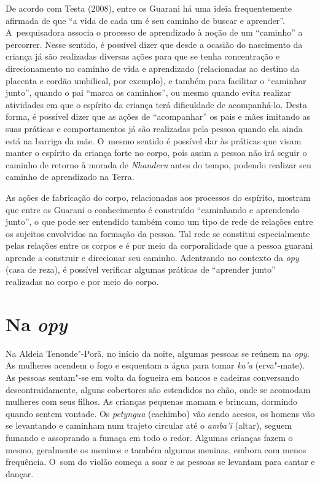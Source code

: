 De acordo com Testa (2008), entre os Guarani há uma ideia frequentemente
afirmada de que ``a vida de cada um é seu caminho de buscar e aprender''.
A~pesquisadora associa o processo de aprendizado à noção de um ``caminho''
a percorrer. Nesse sentido, é possível dizer que desde a ocasião do
nascimento da criança já são realizadas diversas ações para que se
tenha concentração e direcionamento no caminho de vida e aprendizado
(relacionadas ao destino da placenta e cordão umbilical, por exemplo),
e também para facilitar o ``caminhar junto'', quando o pai ``marca os
caminhos'', ou mesmo quando evita realizar atividades em que o espírito
da criança terá dificuldade de acompanhá-lo. Desta forma, é possível
dizer que as ações de ``acompanhar'' os pais e mães imitando as suas
práticas e comportamentos já são realizadas pela pessoa quando ela
ainda está na barriga da mãe. O~mesmo sentido é possível dar às
práticas que visam manter o espírito da criança forte no corpo, pois
assim a pessoa não irá seguir o caminho de retorno à morada de \emph{Nhanderu}
antes do tempo, podendo realizar seu caminho de aprendizado na Terra. 

As ações de fabricação do corpo, relacionadas aos processos do espírito,
mostram que entre os Guarani o conhecimento é construído ``caminhando e
aprendendo junto'', o que pode ser entendido também como um tipo de rede
de relações entre os sujeitos envolvidos na formação da pessoa. Tal
rede se constitui especialmente pelas relações entre os corpos e é por
meio da corporalidade que a pessoa guarani aprende a construir e
direcionar seu caminho. Adentrando no contexto da \emph{opy} (casa de reza), é
possível verificar algumas práticas de ``aprender junto'' realizadas no
corpo e por meio do corpo.

\section{Na \emph{opy}}

Na Aldeia Tenonde"-Porã, no início da noite, algumas pessoas se reúnem na
\emph{opy}. As mulheres acendem o fogo e esquentam a água para tomar \emph{ka’a}
(erva"-mate). As pessoas sentam"-se em volta da fogueira em bancos e
cadeiras conversando descontraidamente, alguns cobertores são
estendidos no chão, onde se acomodam mulheres com seus filhos. As
crianças pequenas mamam e brincam, dormindo quando sentem vontade. Os
\emph{petyngua} (cachimbo) vão sendo acesos, os homens vão se levantando e
caminham num trajeto circular até o \emph{amba’i} (altar), seguem fumando e
assoprando a fumaça em todo o redor. Algumas crianças fazem o mesmo,
geralmente os meninos e também algumas meninas, embora com menos
frequência. O~som do violão começa a soar e as pessoas se levantam para
cantar e dançar. 

